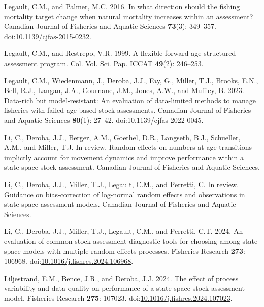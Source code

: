 \begin{CSLReferences}{1}{0}
Legault, C.M., and Palmer, M.C. 2016. In what direction should the
fishing mortality target change when natural mortality increases within
an assessment? Canadian Journal of Fisheries and Aquatic Sciences
\textbf{73}(3): 349--357.
doi:\href{https://doi.org/10.1139/cjfas-2015-0232}{10.1139/cjfas-2015-0232}.

Legault, C.M., and Restrepo, V.R. 1999. A flexible forward
age-structured assessment program. Col. Vol. Sci. Pap. ICCAT
\textbf{49}(2): 246--253.

Legault, C.M., Wiedenmann, J., Deroba, J.J., Fay, G., Miller, T.J.,
Brooks, E.N., Bell, R.J., Langan, J.A., Cournane, J.M., Jones, A.W., and
Muffley, B. 2023. Data-rich but model-resistant: An evaluation of
data-limited methods to manage fisheries with failed age-based stock
assessments. Canadian Journal of Fisheries and Aquatic Sciences
\textbf{80}(1): 27--42.
doi:\href{https://doi.org/10.1139/cjfas-2022-0045}{10.1139/cjfas-2022-0045}.

Li, C., Deroba, J.J., Berger, A.M., Goethel, D.R., Langseth, B.J.,
Schueller, A.M., and Miller, T.J. In review. Random effects on
numbers-at-age transitions implictly account for movement dynamics and
improve performance within a state-space stock assessment. Canadian
Journal of Fisheries and Aquatic Sciences.

Li, C., Deroba, J.J., Miller, T.J., Legault, C.M., and Perretti, C. In
review. Guidance on bias-correction of log-normal random effects and
observations in state-space assessment models. Canadian Journal of
Fisheries and Aquatic Sciences.

Li, C., Deroba, J.J., Miller, T.J., Legault, C.M., and Perretti, C.T.
2024. An evaluation of common stock assessment diagnostic tools for
choosing among state-space models with multiple random effects
processes. Fisheries Research \textbf{273}: 106968.
doi:\href{https://doi.org/10.1016/j.fishres.2024.106968}{10.1016/j.fishres.2024.106968}.

Liljestrand, E.M., Bence, J.R., and Deroba, J.J. 2024. The effect of
process variability and data quality on performance of a state-space
stock assessment model. Fisheries Research \textbf{275}: 107023.
doi:\href{https://doi.org/10.1016/j.fishres.2024.107023}{10.1016/j.fishres.2024.107023}.


\end{CSLReferences}
